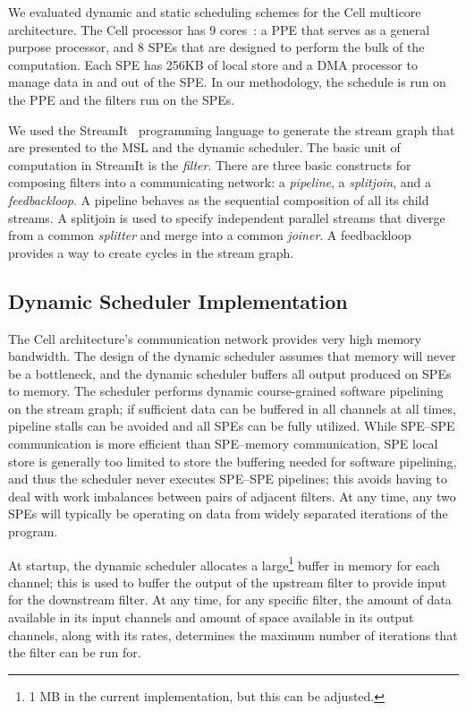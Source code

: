 We evaluated dynamic and static scheduling schemes for the Cell
multicore architecture. The Cell processor has 9
cores~\cite{Cell-hpca}: a PPE that serves as a general purpose
processor, and 8 SPEs that are designed to perform the bulk of the
computation. Each SPE has 256KB of local store and a DMA processor to
manage data in and out of the SPE. In our methodology, the schedule is
run on the PPE and the filters run on the SPEs.

We used the StreamIt~\cite{streamitweb} programming language to
generate the stream graph that are presented to the MSL and the
dynamic scheduler. The basic unit of computation in StreamIt is the
{\it filter}. There are three basic constructs for composing filters
into a communicating network: a {\it pipeline}, a {\it splitjoin}, and
a {\it feedbackloop}. A pipeline behaves as the sequential composition
of all its child streams. A splitjoin is used to specify independent
parallel streams that diverge from a common {\it splitter} and merge
into a common {\it joiner}. A feedbackloop provides a way to create
cycles in the stream graph.

\subsection{Dynamic Scheduler Implementation}\label{ch:ds:imp}

The Cell architecture's communication network provides very high
memory bandwidth. The design of the dynamic scheduler assumes that
memory will never be a bottleneck, and the dynamic scheduler
buffers all output produced on SPEs to memory. The scheduler performs
dynamic course-grained software pipelining on the stream graph; if
sufficient data can be buffered in all channels at all times, pipeline
stalls can be avoided and all SPEs can be fully utilized. While
SPE--SPE communication is more efficient than SPE--memory
communication, SPE local store is generally too limited to store the
buffering needed for software pipelining, and thus the scheduler never
executes SPE--SPE pipelines; this avoids having to deal with work
imbalances between pairs of adjacent filters. At any time, any two
SPEs will typically be operating on data from widely separated
iterations of the program.

At startup, the dynamic scheduler allocates a large\footnote{1 MB in
the current implementation, but this can be adjusted.} buffer in
memory for each channel; this is used to buffer the output of the
upstream filter to provide input for the downstream filter. At any
time, for any specific filter, the amount of data available in its
input channels and amount of space available in its output channels,
along with its rates, determines the maximum number of iterations that
the filter can be run for.

